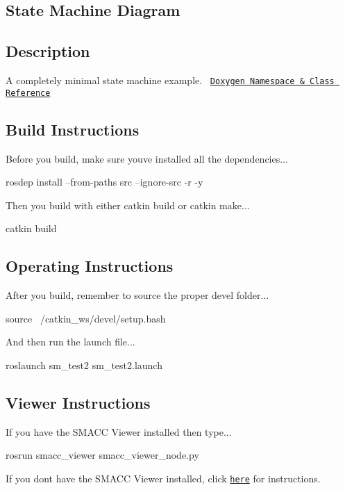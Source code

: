 \subsection*{State Machine Diagram}



\subsection*{Description}

A completely minimal state machine example.~\newline
 \href{https://reelrbtx.github.io/SMACC_Documentation/master/html/namespacesm__atomic.html}{\tt Doxygen Namespace \& Class Reference}

\subsection*{Build Instructions}

Before you build, make sure you\textquotesingle{}ve installed all the dependencies...


\begin{DoxyCode}
rosdep install --from-paths src --ignore-src -r -y 
\end{DoxyCode}


Then you build with either catkin build or catkin make...


\begin{DoxyCode}
catkin build
\end{DoxyCode}
 \subsection*{Operating Instructions}

After you build, remember to source the proper devel folder...


\begin{DoxyCode}
source ~/catkin\_ws/devel/setup.bash
\end{DoxyCode}


And then run the launch file...


\begin{DoxyCode}
roslaunch sm\_test2 sm\_test2.launch
\end{DoxyCode}


\subsection*{Viewer Instructions}

If you have the S\+M\+A\+CC Viewer installed then type...


\begin{DoxyCode}
rosrun smacc\_viewer smacc\_viewer\_node.py
\end{DoxyCode}


If you don\textquotesingle{}t have the S\+M\+A\+CC Viewer installed, click \href{http://smacc.ninja/smacc-viewer/}{\tt here} for instructions. 